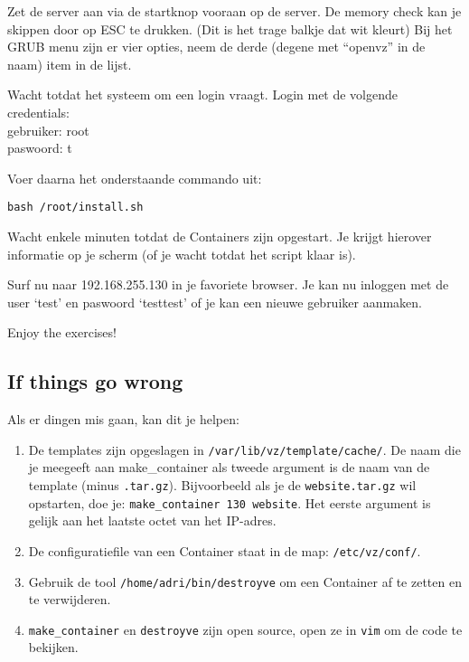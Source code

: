 Zet de server aan via de startknop vooraan op de server. De memory check kan je skippen door op ESC te drukken. (Dit is het trage balkje dat wit kleurt) Bij het GRUB menu zijn er vier opties, neem de derde (degene met ``openvz'' in de naam) item in de lijst. 

Wacht totdat het systeem om een login vraagt. Login met de volgende credentials:\\ 
gebruiker: root\\
paswoord: t

Voer daarna het onderstaande commando uit:
\begin{lstlisting}
bash /root/install.sh
\end{lstlisting}

Wacht enkele minuten totdat de Containers zijn opgestart. Je krijgt hierover informatie op je scherm (of je wacht totdat het script klaar is). 

Surf nu naar 192.168.255.130 in je favoriete browser. 
Je kan nu inloggen met de user `test' en paswoord `testtest' of je kan een nieuwe gebruiker aanmaken.

Enjoy the exercises!

\subsection{If things go wrong}

Als er dingen mis gaan, kan dit je helpen:
\begin{enumerate}
\item De templates zijn opgeslagen in \texttt{/var/lib/vz/template/cache/}. De naam die je meegeeft aan make\_container als tweede argument is de naam van de template (minus \texttt{.tar.gz}). Bijvoorbeeld als je de \texttt{website.tar.gz} wil opstarten, doe je: \texttt{make\_container 130 website}. Het eerste argument is gelijk aan het laatste octet van het IP-adres.
\item De configuratiefile van een Container staat in de map: \texttt{/etc/vz/conf/}.
\item Gebruik de tool \texttt{/home/adri/bin/destroyve} om een Container af te zetten en te verwijderen.
\item \texttt{make\_container} en \texttt{destroyve} zijn open source, open ze in \texttt{vim} om de code te bekijken. 
\end{enumerate}